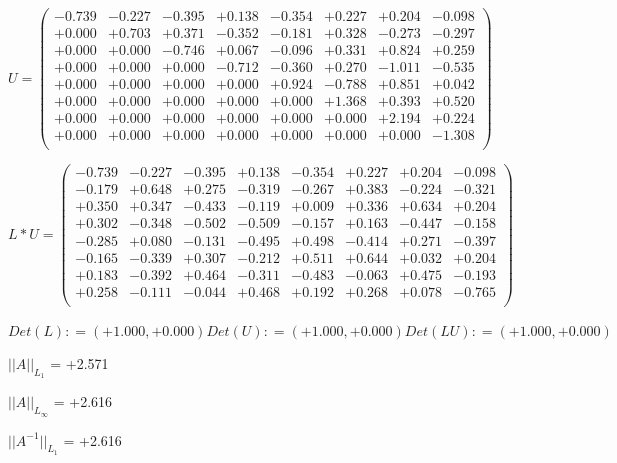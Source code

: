 \documentclass[9pt]{article}
\theoremstyle{plain}
\theoremstyle{definition}
\theoremstyle{remark}
\numberwithin{equation}{section}
\begin{document}
$U = \left(
\begin{array}{
cccccccc}
-0.739 & -0.227 & -0.395 & +0.138 & -0.354 & +0.227 & +0.204 & -0.098 \\
+0.000 & +0.703 & +0.371 & -0.352 & -0.181 & +0.328 & -0.273 & -0.297 \\
+0.000 & +0.000 & -0.746 & +0.067 & -0.096 & +0.331 & +0.824 & +0.259 \\
+0.000 & +0.000 & +0.000 & -0.712 & -0.360 & +0.270 & -1.011 & -0.535 \\
+0.000 & +0.000 & +0.000 & +0.000 & +0.924 & -0.788 & +0.851 & +0.042 \\
+0.000 & +0.000 & +0.000 & +0.000 & +0.000 & +1.368 & +0.393 & +0.520 \\
+0.000 & +0.000 & +0.000 & +0.000 & +0.000 & +0.000 & +2.194 & +0.224 \\
+0.000 & +0.000 & +0.000 & +0.000 & +0.000 & +0.000 & +0.000 & -1.308 \\
\end{array}
\right)$ \newline 

$L * U  = \left(
\begin{array}{
cccccccc}
-0.739 & -0.227 & -0.395 & +0.138 & -0.354 & +0.227 & +0.204 & -0.098 \\
-0.179 & +0.648 & +0.275 & -0.319 & -0.267 & +0.383 & -0.224 & -0.321 \\
+0.350 & +0.347 & -0.433 & -0.119 & +0.009 & +0.336 & +0.634 & +0.204 \\
+0.302 & -0.348 & -0.502 & -0.509 & -0.157 & +0.163 & -0.447 & -0.158 \\
-0.285 & +0.080 & -0.131 & -0.495 & +0.498 & -0.414 & +0.271 & -0.397 \\
-0.165 & -0.339 & +0.307 & -0.212 & +0.511 & +0.644 & +0.032 & +0.204 \\
+0.183 & -0.392 & +0.464 & -0.311 & -0.483 & -0.063 & +0.475 & -0.193 \\
+0.258 & -0.111 & -0.044 & +0.468 & +0.192 & +0.268 & +0.078 & -0.765 \\
\end{array}
\right)$ \newline 

$Det(L) :    = (+1.000,+0.000)     Det(U) :    = (+1.000,+0.000)     Det(LU) :    = (+1.000,+0.000)$

$||A||_{L_1}$  = +2.571

$||A||_{L_{\infty}}$ = +2.616

$||A^{-1}||_{L_1}$  = +2.616
\end{document}
